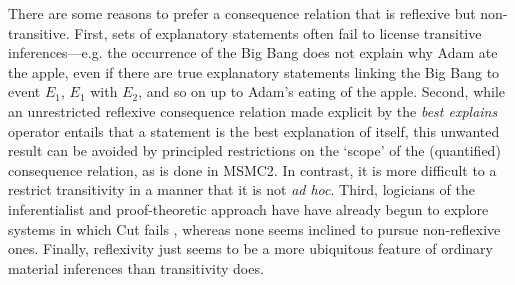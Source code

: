 \documentclass{svjour3}                     %
\begin{document}
There are some reasons to prefer a consequence relation that is reflexive but non-transitive. First, sets of explanatory statements often fail to license transitive inferences---e.g. the occurrence of the Big Bang does not explain why Adam ate the apple, even if there are true explanatory statements linking the Big Bang to event $E_1$, $ E_1 $ with $ E_2 $, and so on up to Adam's eating of the apple. Second, while an unrestricted reflexive consequence relation made explicit by the \textit{best explains} operator entails that a statement is the best explanation of itself, this unwanted result can be avoided by principled restrictions on the `scope' of the (quantified) consequence relation, as is done in MSMC2. In contrast, it is more difficult to a restrict transitivity in a manner that it is not \textit{ad hoc}. Third, logicians of the inferentialist and proof-theoretic approach have have already begun to explore systems in which Cut fails \citep{Ripley2011,Tennant2014}, whereas none seems inclined to pursue non-reflexive ones. Finally, reflexivity just seems to be a more ubiquitous feature of ordinary material inferences than transitivity does.


 

%
%
%
%
\end{document}
